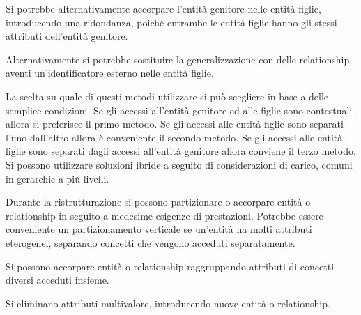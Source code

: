 \documentclass{article}
\numberwithin{equation}{subsection}
\begin{document}
Si potrebbe alternativamente accorpare l'entità genitore nelle entità figlie, introducendo una ridondanza, poiché entrambe le entità figlie hanno gli stessi attributi dell'entità genitore. 


Alternativamente si potrebbe sostituire la generalizzazione con delle relationship, aventi un'identificatore esterno nelle entità figlie. 


La scelta su quale di questi metodi utilizzare si può scegliere in base a delle semplice condizioni. Se gli accessi all'entità genitore ed alle figlie sono contestuali allora si preferisce il primo metodo. Se gli accessi alle entità figlie sono separati l'uno dall'altro allora è conveniente il secondo metodo. Se gli accessi alle entità figlie sono separati dagli accessi all'entità genitore allora conviene il terzo metodo. 
Si possono utilizzare soluzioni ibride a seguito di considerazioni di carico, comuni in gerarchie a più livelli. 

Durante la ristrutturazione si possono partizionare o accorpare entità o relationship in seguito a medesime esigenze di prestazioni. 
Potrebbe essere conveniente un partizionamento verticale se un'entità ha molti attributi eterogenei, separando concetti che vengono acceduti separatamente. 


Si possono accorpare entità o relationship raggruppando attributi di concetti diversi acceduti insieme. 

Si eliminano attributi multivalore, introducendo nuove entità o relationship. 
\end{document}

